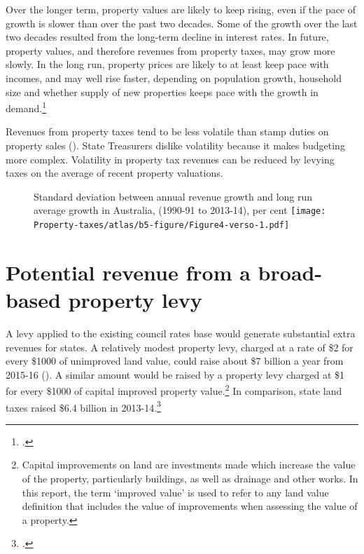 \documentclass[twoside,english]{palatinob5portrait}
\begin{document}
Over the longer term, property values are likely to keep rising, even if the pace of growth is slower than over the past two decades. Some of the growth over the last two decades resulted from the long-term decline in interest rates. In future, property values, and therefore revenues from property taxes, may grow more slowly.  In the long run, property prices are likely to at least keep pace with incomes, and may well rise faster, depending on population growth, household size and whether supply of new properties keeps pace with the growth in demand.\footcite[][6--7]{RBA2014SubmissionAffordableHousingInquiry}  

Revenues from property taxes tend to be less volatile than stamp duties on property sales (). State Treasurers dislike volatility because it makes budgeting more complex. Volatility in property tax revenues can be reduced by levying taxes on the average of recent property valuations. 



\begin{figure}[h]
%
{Standard deviation between annual revenue growth and long run average growth in Australia, (1990-91 to 2013-14), per cent}
\texttt{[image: Property-taxes/atlas/b5-figure/Figure4-verso-1.pdf]}

\end{figure}
\section{Potential revenue from a broad-based property levy\label{sec:PROP-3-3}}
A levy applied to the existing council rates base would generate substantial extra revenues for states. A relatively modest property levy, charged at a rate of \$2 for every \$1000 of unimproved land value, could raise about \$7 billion a year from 2015-16 (). A similar amount would be raised by a property levy charged at \$1 for every \$1000 of capital improved property value.\footnote{Capital improvements on land are investments made which increase the value of the property, particularly buildings, as well as drainage and other works. In this report, the term ‘improved value’ is used to refer to any land value definition that includes the value of improvements when assessing the value of a property.}   In comparison, state land taxes raised \$6.4 billion in 2013-14.\footcite{ABS2015h} 
\end{document}
